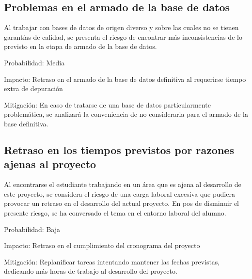 \documentclass[12pt,bibliography=openstyle,DIV=12,parskip=full-]{scrartcl}
\begin{document}
\subsection{Problemas en el armado de la base de datos}
Al trabajar con bases de datos de origen diverso y sobre las
cuales no se tienen garantías de calidad, se presenta el riesgo de
encontrar más inconsistencias de lo previsto en la etapa de armado de
la base de datos.
\begin{description*}
  \item[Probabilidad:] Media
  \item[Impacto:] Retraso en el armado de la base de datos definitiva
    al requerirse tiempo extra de depuración
  \item[Mitigación:] En caso de tratarse de una base de datos
    particularmente problemática, se analizará la conveniencia de no
    considerarla para el armado de la base definitiva.
\end{description*}
%
\subsection{Retraso en los tiempos previstos por razones ajenas al proyecto}
Al encontrarse el estudiante trabajando en un área que es ajena al
desarrollo de este proyecto, se considera el riesgo de una carga
laboral excesiva que pudiera provocar un retraso en el desarrollo del
actual proyecto. En pos de disminuir el presente riesgo, se ha
conversado el tema en el entorno laboral del alumno.
\begin{description*}
  \item[Probabilidad:] Baja
  \item[Impacto:] Retraso en el cumplimiento del cronograma del
    proyecto
  \item[Mitigación:] Replanificar tareas intentando mantener las
    fechas previstas, dedicando más horas de trabajo al desarrollo del
    proyecto.
\end{description*}
%
\end{document}
